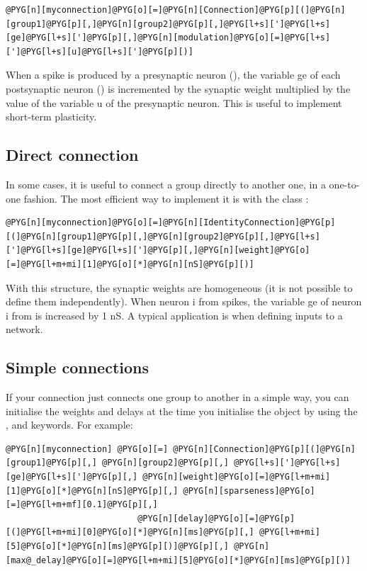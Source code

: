 \documentclass[letterpaper,10pt,english]{manual}
\begin{document}
\begin{Verbatim}[commandchars=@\[\]]
@PYG[n][myconnection]@PYG[o][=]@PYG[n][Connection]@PYG[p][(]@PYG[n][group1]@PYG[p][,]@PYG[n][group2]@PYG[p][,]@PYG[l+s][']@PYG[l+s][ge]@PYG[l+s][']@PYG[p][,]@PYG[n][modulation]@PYG[o][=]@PYG[l+s][']@PYG[l+s][u]@PYG[l+s][']@PYG[p][)]
\end{Verbatim}

When a spike is produced by a presynaptic neuron (), the variable ge of each postsynaptic
neuron () is incremented by the synaptic weight multiplied by the value of the variable u
of the presynaptic neuron. This is useful to implement short-term plasticity.


\subsection{Direct connection}

In some cases, it is useful to connect a group directly to another one, in a one-to-one fashion.
The most efficient way to implement it is with the class \hyperlink{brian.IdentityConnection}{}:

\begin{Verbatim}[commandchars=@\[\]]
@PYG[n][myconnection]@PYG[o][=]@PYG[n][IdentityConnection]@PYG[p][(]@PYG[n][group1]@PYG[p][,]@PYG[n][group2]@PYG[p][,]@PYG[l+s][']@PYG[l+s][ge]@PYG[l+s][']@PYG[p][,]@PYG[n][weight]@PYG[o][=]@PYG[l+m+mi][1]@PYG[o][*]@PYG[n][nS]@PYG[p][)]
\end{Verbatim}

With this structure, the synaptic weights are homogeneous (it is not possible to define them
independently). When neuron i from  spikes, the variable ge of neuron i from 
is increased by 1 nS. A typical application is when defining inputs to a network.


\subsection{Simple connections}

If your connection just connects one group to another in a simple way, you can initialise
the weights and delays at the time you initialise the \hyperlink{brian.Connection}{} object by using
the ,  and  keywords. For example:

\begin{Verbatim}[commandchars=@\[\]]
@PYG[n][myconnection] @PYG[o][=] @PYG[n][Connection]@PYG[p][(]@PYG[n][group1]@PYG[p][,] @PYG[n][group2]@PYG[p][,] @PYG[l+s][']@PYG[l+s][ge]@PYG[l+s][']@PYG[p][,] @PYG[n][weight]@PYG[o][=]@PYG[l+m+mi][1]@PYG[o][*]@PYG[n][nS]@PYG[p][,] @PYG[n][sparseness]@PYG[o][=]@PYG[l+m+mf][0.1]@PYG[p][,]
                          @PYG[n][delay]@PYG[o][=]@PYG[p][(]@PYG[l+m+mi][0]@PYG[o][*]@PYG[n][ms]@PYG[p][,] @PYG[l+m+mi][5]@PYG[o][*]@PYG[n][ms]@PYG[p][)]@PYG[p][,] @PYG[n][max@_delay]@PYG[o][=]@PYG[l+m+mi][5]@PYG[o][*]@PYG[n][ms]@PYG[p][)]
\end{Verbatim}
\end{document}
